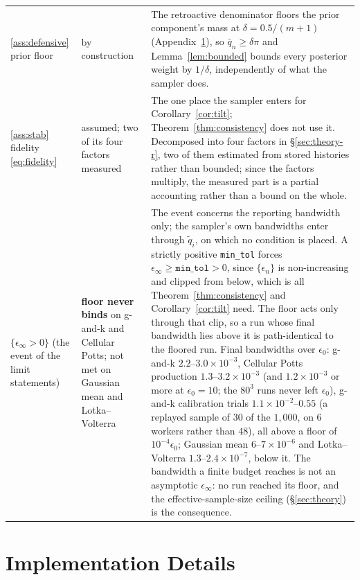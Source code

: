 \documentclass[10pt]{article}
\theoremstyle{plain}
\theoremstyle{definition}
\begin{document}
\begin{table}[h]
\begin{tabular}{@{}p{}p{}p{}@{}}
\ref{ass:defensive} prior floor & by construction & The retroactive denominator floors the prior component's mass at $\delta=0.5/(m{+}1)$ (Appendix~\ref{app:implementation}), so $\bar q_n\ge\delta\pi$ and Lemma~\ref{lem:bounded} bounds every posterior weight by $1/\delta$, independently of what the sampler does. \\
\ref{ass:stab} fidelity \eqref{eq:fidelity} & assumed; two of its four factors measured & The one place the sampler enters for Corollary~\ref{cor:tilt}; Theorem~\ref{thm:consistency} does not use it. Decomposed into four factors in \S\ref{sec:theory-r}, two of them estimated from stored histories rather than bounded; since the factors multiply, the measured part is a partial accounting rather than a bound on the whole. \\
$\{\epsilon_\infty>0\}$ (the event of the limit statements) & \textbf{floor never binds} on g-and-k and Cellular Potts; not met on Gaussian mean and Lotka--Volterra & The event concerns the reporting bandwidth only; the sampler's own bandwidths enter through $\tilde q_i$, on which no condition is placed. A strictly positive \texttt{min\_tol} forces $\epsilon_\infty\ge\texttt{min\_tol}>0$, since $\{\epsilon_n\}$ is non-increasing and clipped from below, which is all Theorem~\ref{thm:consistency} and Corollary~\ref{cor:tilt} need. The floor acts only through that clip, so a run whose final bandwidth lies above it is path-identical to the floored run. Final bandwidths over $\epsilon_0$: g-and-k $2.2$--$3.0\times10^{-3}$, Cellular Potts production $1.3$--$3.2\times10^{-3}$ (and $1.2\times10^{-3}$ or more at $\epsilon_0=10$; the $80^3$ runs never left $\epsilon_0$), g-and-k calibration trials $1.1\times10^{-2}$--$0.55$ (a replayed sample of $30$ of the $1{,}000$, on $6$ workers rather than $48$), all above a floor of $10^{-4}\epsilon_0$; Gaussian mean $6$--$7\times10^{-6}$ and Lotka--Volterra $1.3$--$2.4\times10^{-7}$, below it. The bandwidth a finite budget reaches is not an asymptotic $\epsilon_\infty$: no run reached its floor, and the effective-sample-size ceiling (\S\ref{sec:theory}) is the consequence. \\
\bottomrule
\end{tabular}
\end{table}

\section{Implementation Details}\label{app:implementation}
\end{document}
